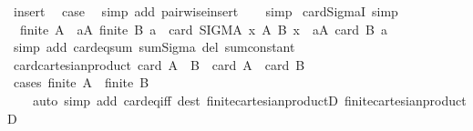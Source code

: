 \begin{isabellebody}
\ insert\ \isamarkupfalse%
\ {\isacharquery}{\kern0pt}case\ \isamarkupfalse%
\ {\isacharparenleft}{\kern0pt}simp\ add{\isacharcolon}{\kern0pt}\ pairwise{\isacharunderscore}{\kern0pt}insert{\isacharparenright}{\kern0pt}\isanewline
\ \ \isamarkupfalse%
\isanewline
{}\isamarkupfalse%
\ simp%
\endisatagproof
{\isafoldproof}%
%
\isadelimproof
%
\endisadelimproof
%
\isadelimdocument
%
\endisadelimdocument
%
\isatagdocument
%
\isamarkuptrue%
%
\endisatagdocument
{\isafolddocument}%
%
\isadelimdocument
%
\endisadelimdocument
{}\isamarkupfalse%
\ card{\isacharunderscore}{\kern0pt}SigmaI\ {\isacharbrackleft}{\kern0pt}simp{\isacharbrackright}{\kern0pt}{\isacharcolon}{\kern0pt}\isanewline
\ \ {\isachardoublequoteopen}finite\ A\ {\isasymLongrightarrow}\ {\isasymforall}a{\isasymin}A{\isachardot}{\kern0pt}\ finite\ {\isacharparenleft}{\kern0pt}B\ a{\isacharparenright}{\kern0pt}\ {\isasymLongrightarrow}\ card\ {\isacharparenleft}{\kern0pt}SIGMA\ x{\isacharcolon}{\kern0pt}\ A{\isachardot}{\kern0pt}\ B\ x{\isacharparenright}{\kern0pt}\ {\isacharequal}{\kern0pt}\ {\isacharparenleft}{\kern0pt}{\isasymSum}a{\isasymin}A{\isachardot}{\kern0pt}\ card\ {\isacharparenleft}{\kern0pt}B\ a{\isacharparenright}{\kern0pt}{\isacharparenright}{\kern0pt}{\isachardoublequoteclose}\isanewline
%
\isadelimproof
\ \ %
\endisadelimproof
%
\isatagproof
{}\isamarkupfalse%
\ {\isacharparenleft}{\kern0pt}simp\ add{\isacharcolon}{\kern0pt}\ card{\isacharunderscore}{\kern0pt}eq{\isacharunderscore}{\kern0pt}sum\ sum{\isachardot}{\kern0pt}Sigma\ del{\isacharcolon}{\kern0pt}\ sum{\isacharunderscore}{\kern0pt}constant{\isacharparenright}{\kern0pt}%
\endisatagproof
{\isafoldproof}%
%
\isadelimproof
\isanewline
%
\endisadelimproof
\isanewline
\isanewline
\isanewline
{}\isamarkupfalse%
\ card{\isacharunderscore}{\kern0pt}cartesian{\isacharunderscore}{\kern0pt}product{\isacharcolon}{\kern0pt}\ {\isachardoublequoteopen}card\ {\isacharparenleft}{\kern0pt}A\ {\isasymtimes}\ B{\isacharparenright}{\kern0pt}\ {\isacharequal}{\kern0pt}\ card\ A\ {\isacharasterisk}{\kern0pt}\ card\ B{\isachardoublequoteclose}\isanewline
%
\isadelimproof
\ \ %
\endisadelimproof
%
\isatagproof
{}\isamarkupfalse%
\ {\isacharparenleft}{\kern0pt}cases\ {\isachardoublequoteopen}finite\ A\ {\isasymand}\ finite\ B{\isachardoublequoteclose}{\isacharparenright}{\kern0pt}\isanewline
\ \ \ \ {\isacharparenleft}{\kern0pt}auto\ simp\ add{\isacharcolon}{\kern0pt}\ card{\isacharunderscore}{\kern0pt}eq{\isacharunderscore}{\kern0pt}{}{\isacharunderscore}{\kern0pt}iff\ dest{\isacharcolon}{\kern0pt}\ finite{\isacharunderscore}{\kern0pt}cartesian{\isacharunderscore}{\kern0pt}productD{}\ finite{\isacharunderscore}{\kern0pt}cartesian{\isacharunderscore}{\kern0pt}productD{}{\isacharparenright}{\kern0pt}%

\end{isabellebody}
